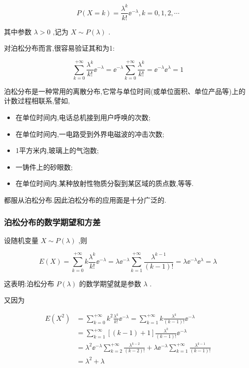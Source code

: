 \begin{equation}
P(X=k)=\frac{\lambda^{k}}{k !} \ee ^{-\lambda}, k=0,1,2, \cdots \label{eq:2.4.3}
\end{equation}

其中参数 $ \lambda >0 $ ,记为 $ X \sim P(\lambda) $ .

对泊松分布而言,很容易验证其和为1:

\[
\sum_{k=0}^{+\infty} \frac{\lambda^{k}}{k !} \ee ^{-\lambda}=\ee ^{-\lambda} \sum_{k=0}^{+\infty} \frac{\lambda^{k}}{k !}=\ee ^{-\lambda} \ee ^{\lambda}=1
\]

泊松分布是一种常用的离散分布,它常与单位时间(或单位面积、单位产品等)上的计数过程相联系,譬如,

\begin{itemize}
	\item 在单位时间内,电话总机接到用户呼唤的次数;
	\item 在单位时间内,一电路受到外界电磁波的冲击次数;
	\item 1平方米内,玻璃上的气泡数;
	\item 一铸件上的砂眼数;
	\item 在单位时间内,某种放射性物质分裂到某区域的质点数,等等.
\end{itemize}

都服从泊松分布.因此泊松分布的应用面是十分广泛的.

\subsubsection{泊松分布的数学期望和方差}

设随机变量 $ X \sim P(\lambda) $ ,则

\[
E(X)=\sum_{k=0}^{+\infty} k \frac{\lambda^{k}}{k !} \ee ^{-\lambda}=\lambda \ee ^{-\lambda} \sum_{k=1}^{+\infty} \frac{\lambda^{k-1}}{(k-1) !}=\lambda \ee ^{-\lambda} \ee ^{\lambda}=\lambda
\]

这表明:泊松分布 $ P(\lambda) $ 的数学期望就是参数 $ \lambda $ .

又因为

\[
\begin{aligned} E\left(X^{2}\right) &=\sum_{k=0}^{+\infty} k^{2} \frac{\lambda^{k}}{k !} \ee ^{-\lambda}=\sum_{k=1}^{+\infty} k \frac{\lambda^{k}}{(k-1) !} \ee ^{-\lambda} \\ &=\sum_{k=1}^{+\infty}[(k-1)+1] \frac{\lambda^{k}}{(k-1) !} \ee ^{-\lambda} \\ &=\lambda^{2} \ee ^{-\lambda} \sum_{k=2}^{+\infty} \frac{\lambda^{k-2}}{(k-2) !}+\lambda \ee ^{-\lambda} \sum_{k=1}^{+\infty} \frac{\lambda^{k-1}}{(k-1) !} \\ &=\lambda^{2}+\lambda \end{aligned}
\]

